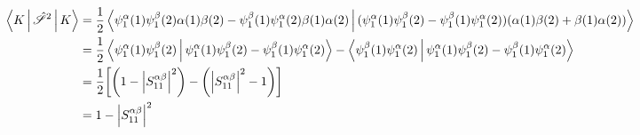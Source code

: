 \documentclass[a4paper]{article}
\begin{document}
\begin{align}
\Braket{K | \hat{\mathscr{S}}^2 | K} &= \dfrac{1}{2} \Braket{\psi_1^\alpha(1)\psi_1^\beta(2)\alpha(1)\beta(2) - \psi_1^\beta(1)\psi_1^\alpha(2)\beta(1)\alpha(2) | (\psi_1^\alpha(1)\psi_1^\beta(2) - \psi_1^\beta(1)\psi_1^\alpha(2)) (\alpha(1)\beta(2) + \beta(1)\alpha(2))} \notag\\
&= \dfrac{1}{2} \Braket{\psi_1^\alpha(1)\psi_1^\beta(2) | \psi_1^\alpha(1)\psi_1^\beta(2) - \psi_1^\beta(1)\psi_1^\alpha(2)} - \Braket{\psi_1^\beta(1)\psi_1^\alpha(2) | \psi_1^\alpha(1)\psi_1^\beta(2) - \psi_1^\beta(1)\psi_1^\alpha(2)} \notag\\
&= \dfrac{1}{2}\qty[\qty(1 - \abs{S_{11}^{\alpha\beta}}^2) - \qty(\abs{S_{11}^{\alpha\beta}}^2 - 1)] \notag\\
&= 1 - \abs{S_{11}^{\alpha\beta}}^2
\end{align}
\end{document}

